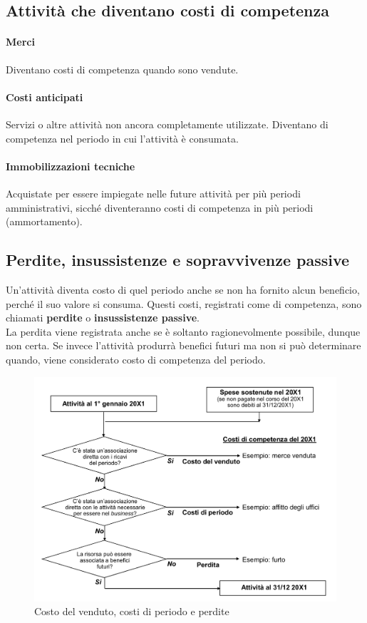 \documentclass{report}
\begin{document}
	\subsection{Attività che diventano costi di competenza}
	\paragraph{Merci} Diventano costi di competenza quando sono vendute.
	\paragraph{Costi anticipati} Servizi o altre attività non ancora completamente utilizzate. Diventano di competenza nel periodo in cui l'attività è consumata.
	\paragraph{Immobilizzazioni tecniche} Acquistate per essere impiegate nelle future attività per più periodi amministrativi, sicché diventeranno costi di competenza in più periodi (ammortamento).
	\subsection{Perdite, insussistenze e sopravvivenze passive}
	Un'attività diventa costo di quel periodo anche se non ha fornito alcun beneficio, perché il suo valore si consuma. Questi costi, registrati come di competenza, sono chiamati \textbf{perdite} o \textbf{insussistenze passive}.
	\medskip \\La perdita viene registrata anche se è soltanto ragionevolmente possibile, dunque non certa. Se invece l'attività produrrà benefici futuri ma non si può determinare quando, viene considerato costo di competenza del periodo.
	\begin{figure}[h]
		\centering
		\includegraphics[width=0.7\linewidth]{sintesi-costi-perdite}
		\caption{Costo del venduto, costi di periodo e perdite}
		\label{fig:sintesi-costi-perdite}
	\end{figure}
	\newpage
\end{document}
